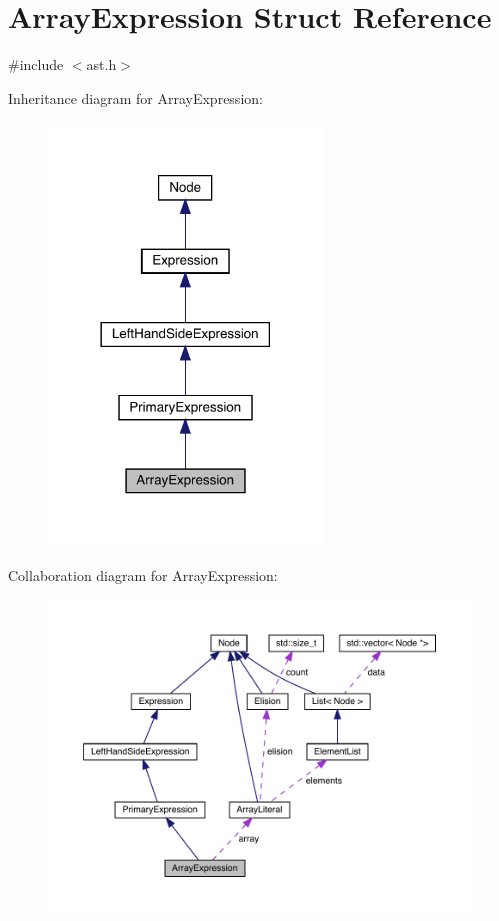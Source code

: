 \hypertarget{struct_array_expression}{}\section{Array\+Expression Struct Reference}
\label{struct_array_expression}


{\ttfamily \#include $<$ast.\+h$>$}



Inheritance diagram for Array\+Expression\+:
\nopagebreak
\begin{figure}[H]
\begin{center}
\leavevmode
\includegraphics[width=206pt]{struct_array_expression__inherit__graph}
\end{center}
\end{figure}


Collaboration diagram for Array\+Expression\+:
\nopagebreak
\begin{figure}[H]
\begin{center}
\leavevmode
\includegraphics[width=350pt]{struct_array_expression__coll__graph}
\end{center}
\end{figure}
